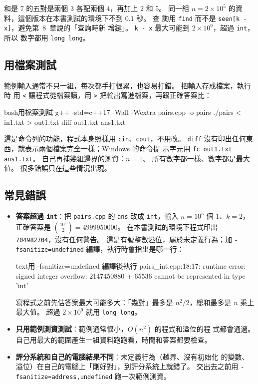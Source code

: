 和是 $7$ 的五對是兩個 $3$ 各配兩個 $4$，再加上 $2$ 和 $5$。 同一組
$n = 2 \times 10^5$ 的資料，這個版本在本書測試的環境下不到 $0.1$ 秒。 查
詢用 \texttt{find} 而不是 \texttt{seen[k - x]}，避免第~8~章說的「查詢時新
增鍵」。 \texttt{k - x} 最大可能到 $2 \times 10^9$，超過 \texttt{int}，所以
數字都用 \texttt{long long}。

\subsection{用檔案測試}

範例輸入通常不只一組，每次都手打很累，也容易打錯。 把輸入存成檔案，執行時
用 \texttt{<} 讓程式從檔案讀，用 \texttt{>} 把輸出寫進檔案，再跟正確答案比：

\begin{code}{bash}{用檔案測試}
g++ -std=c++17 -Wall -Wextra pairs.cpp -o pairs
./pairs < in1.txt > out1.txt
diff out1.txt ans1.txt
\end{code}

這是命令列的功能，程式本身照樣用 \texttt{cin}、\texttt{cout}，不用改。
\texttt{diff} 沒有印出任何東西，就表示兩個檔案完全一樣；Windows 的命令提
示字元用 \texttt{fc out1.txt ans1.txt}。 自己再補幾組邊界的測資：$n = 1$、
所有數字都一樣、數字都是最大值。 很多錯誤只在這些情況出現。

\subsection{常見錯誤}

\begin{itemize}
\item \textbf{答案超過 \texttt{int}}：把 \texttt{pairs.cpp} 的 \texttt{ans}
改成 \texttt{int}，輸入 $n = 10^5$ 個 $1$、$k = 2$，正確答案是
$\binom{10^5}{2} = 4999950000$。 在本書測試的環境下程式印出
\texttt{704982704}，沒有任何警告。 這是有號整數溢位，屬於未定義行為；加
\texttt{-fsanitize=undefined} 編譯，執行時會指出是哪一行：
\begin{code}{text}{用 -fsanitize=undefined 編譯後執行}
pairs_int.cpp:18:17: runtime error: signed integer overflow: 2147450880 + 65536 cannot be represented in type 'int'
\end{code}
寫程式之前先估答案最大可能多大：「幾對」最多是 $n^2 / 2$，總和最多是 $n$
乘上最大值。 超過 $2 \times 10^9$ 就用 \texttt{long long}。
\item \textbf{只用範例測資測試}：範例通常很小，$O(n^2)$ 的程式和溢位的程
式都會通過。 自己用最大的範圍產生一組資料跑跑看，時間和答案都要檢查。
\item \textbf{評分系統和自己的電腦結果不同}：未定義行為（越界、沒有初始化
的變數、溢位）在自己的電腦上「剛好對」，到評分系統上就錯了。 交出去之前用
\texttt{-fsanitize=address,undefined} 跑一次範例測資。
\end{itemize}

